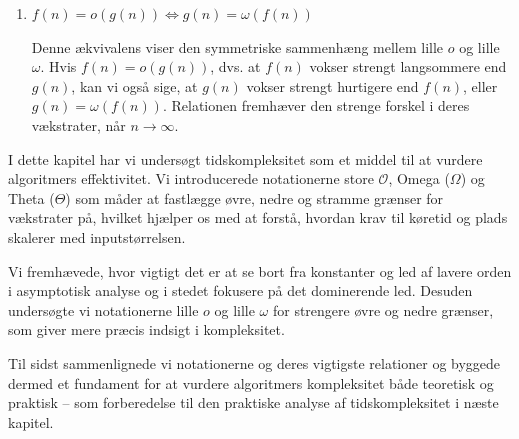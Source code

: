 \begin{enumerate}
    \item \( f(n) = o(g(n)) \Leftrightarrow g(n) = \omega(f(n)) \)
    
    Denne ækvivalens viser den symmetriske sammenhæng mellem lille \(o\) og lille \(\omega\). Hvis \( f(n) = o(g(n)) \), dvs. at \( f(n) \) vokser strengt langsommere end \( g(n) \), kan vi også sige, at \( g(n) \) vokser strengt hurtigere end \( f(n) \), eller \( g(n) = \omega(f(n)) \). Relationen fremhæver den strenge forskel i deres vækstrater, når \( n \to \infty \).
\end{enumerate}

I dette kapitel har vi undersøgt tidskompleksitet som et middel til at vurdere algoritmers effektivitet. Vi introducerede notationerne store $\mathcal{O}$, Omega ($\Omega$) og Theta ($\Theta$) som måder at fastlægge øvre, nedre og stramme grænser for vækstrater på, hvilket hjælper os med at forstå, hvordan krav til køretid og plads skalerer med inputstørrelsen.

Vi fremhævede, hvor vigtigt det er at se bort fra konstanter og led af lavere orden i asymptotisk analyse og i stedet fokusere på det dominerende led. Desuden undersøgte vi notationerne lille $o$ og lille $\omega$ for strengere øvre og nedre grænser, som giver mere præcis indsigt i kompleksitet.

Til sidst sammenlignede vi notationerne og deres vigtigste relationer og byggede dermed et fundament for at vurdere algoritmers kompleksitet både teoretisk og praktisk -- som forberedelse til den praktiske analyse af tidskompleksitet i næste kapitel.
